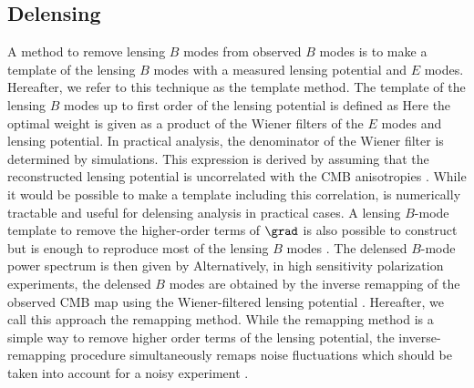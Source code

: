 \documentclass[aps,prd,twocolumn,superscriptaddress,groupedaddress,nofootinbib]{revtex4}
\def\dB{\hB^{\rm d}}
\def\o{\star}
\begin{document}
\subsection{Delensing}

A method to remove lensing $B$ modes from observed $B$ modes is to make a template of the lensing $B$ modes
with a measured lensing potential and $E$ modes. Hereafter, we refer to this technique as the template method. 
The template of the lensing $B$ modes up to first order of the lensing potential is defined as \cite{Smith:2010gu}
\al{
	(\hE\o\estg)_{\bl} = -\Int{2}{\bl'}{(2\pi)^2} 
		\frac{\CEE_{\l'}}{\hCEE_{\l'}}\frac{\Cgg_{|\bl-\bl'|}}{\hCgg_{|\bl-\bl'|}} 
		w_{\bl,\bl-\bl'} \hE_{\bl'} \estg_{\bl-\bl'}
	\,. \label{Eq:Ephi}
}
Here the optimal weight is given as a product of the Wiener filters of the $E$ modes and lensing potential.
In practical analysis, the denominator of the Wiener filter is determined by simulations. 
This expression is derived by assuming that the reconstructed lensing potential is uncorrelated with 
the CMB anisotropies \cite{Smith:2010gu}. 
While it would be possible to make a template including this correlation, 
 is numerically tractable and useful for delensing analysis in practical cases. 
A lensing $B$-mode template to remove the higher-order terms of $\grad$ is also possible to construct 
but  is enough to reproduce most of the lensing $B$ modes \cite{Smith:2010gu}. 
The delensed $B$-mode power spectrum is then given by \cite{Smith:2010gu}
\al{
	C^{\dB\dB}_\l = \Int{2}{\bl'}{(2\pi)^2} w^2_{\bl,\bl-\bl'} 
		\left( 1-\frac{(\CEE_{\l'})^2}{\hCEE_{\l'}}\frac{(\Cgg_{|\bl-\bl'|})^2}{\hCgg_{|\bl-\bl'|}} \right) 
	\,. \label{Eq:resBB}
}
Alternatively, in high sensitivity polarization experiments, the delensed $B$ modes are obtained by 
the inverse remapping of the observed CMB map using the Wiener-filtered lensing potential \cite{Green:2016}. 
Hereafter, we call this approach the remapping method. 
While the remapping method is a simple way to remove higher order terms of the lensing potential, 
the inverse-remapping procedure simultaneously remaps noise fluctuations which should be taken into account 
for a noisy experiment \cite{Carron:2017}. 
\end{document}
